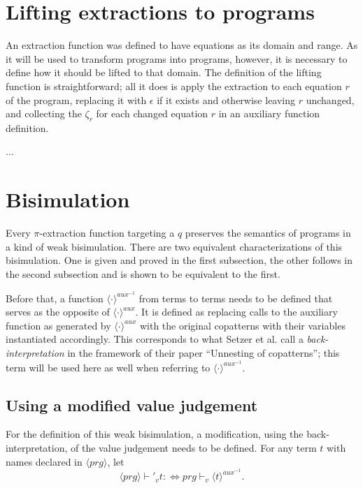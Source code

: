 \section{Lifting extractions to programs}

An extraction function was defined to have equations as its domain and range. As it will be used to transform programs into programs, however, it is necessary to define how it should be lifted to that domain. The definition of the lifting function is straightforward; all it does is apply the extraction to each equation $r$ of the program, replacing it with $\epsilon$ if it exists and otherwise leaving $r$ unchanged, and collecting the $\zeta_r$ for each changed equation $r$ in an auxiliary function definition.

...

\section{Bisimulation}

Every $\pi$-extraction function targeting a $q$ preserves the semantics of programs in a kind of weak bisimulation. There are two equivalent characterizations of this bisimulation. One is given and proved in the first subsection, the other follows in the second subsection and is shown to be equivalent to the first.

Before that, a function $\langle \cdot \rangle^{aux^{-1}}$ from terms to terms needs to be defined that serves as the opposite of $\langle \cdot \rangle^{aux}$. It is defined as replacing calls to the auxiliary function as generated by $\langle \cdot \rangle^{aux}$ with the original copatterns with their variables instantiated accordingly. This corresponds to what Setzer et al. call a \textit{back-interpretation} in the framework of their paper ``Unnesting of copatterns''; this term will be used here as well when referring to $\langle \cdot \rangle^{aux^{-1}}$.

\subsection{Using a modified value judgement}

For the definition of this weak bisimulation, a modification, using the back-interpretation, of the value judgement needs to be defined. For any term $t$ with names declared in $\langle prg \rangle$, let
\[
\langle prg \rangle \vdash'_v t :\iff prg \vdash_v \langle t \rangle^{aux^{-1}}.
\]

